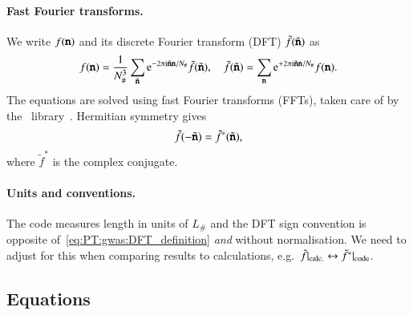 






\paragraph{Fast Fourier transforms.} %
We write $f(\boldsymbol{\mathtt{n}})$ and its discrete Fourier transform (DFT) $\tilde{f}(\tilde{\boldsymbol{\mathtt{n}}})$ as
\begin{equation}\label{eq:PT:gwas:DFT_definition}
    f(\lcoordx) = \frac{1}{N_\#^3} \sum_{\lcoordk } \eu[-2\ppi \im \lcoordk \lcoordx/N_\# ]\tilde{f}(\lcoordk) , \quad \tilde{f}(\lcoordk) = \sum_{\lcoordx} \eu[+2\ppi \im \lcoordk \lcoordx/N_\#  ]f(\lcoordx).
\end{equation}
The equations are solved using fast Fourier transforms (FFTs), taken care of by the~\latfield{} library~\citep{daverioLatfield2LibraryClassical2016}. Hermitian symmetry gives
\begin{equation}
    \tilde{f}(-\tilde{\boldsymbol{\mathtt{n}}}) =  \tilde{f}^\ast(\tilde{\boldsymbol{\mathtt{n}}}),
\end{equation}
where $\tilde{f}^\ast$ is the complex conjugate. 


\paragraph{Units and conventions.} %
The code measures length in units of $L_\#$ and the DFT sign convention is opposite of~\cref{eq:PT:gwas:DFT_definition} \emph{and} without normalisation. We need to adjust for this when comparing results to calculations, e.g.~$\tilde{f}\rvert_\mathrm{calc.} \leftrightarrow \tilde{f}^\ast\rvert_\mathrm{code}$.





\subsection{Equations}

